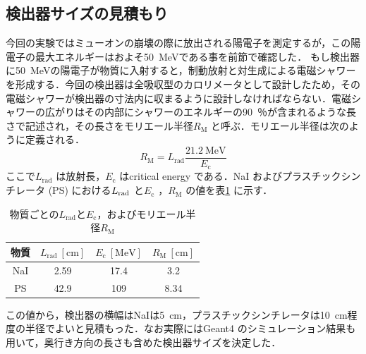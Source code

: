 \subsection{検出器サイズの見積もり}
今回の実験ではミューオンの崩壊の際に放出される陽電子を測定するが，この陽電子の最大エネルギーはおよそ50~MeVである事を前節で確認した．
もし検出器に50~MeVの陽電子が物質に入射すると，制動放射と対生成による電磁シャワーを形成する．今回の検出器は全吸収型のカロリメータとして設計したため，その電磁シャワーが検出器の寸法内に収まるように設計しなければならない．電磁シャワーの広がりはその内部にシャワーのエネルギーの90~％が含まれるような長さで記述され，その長さをモリエール半径$R_\mathrm{M}$ と呼ぶ．モリエール半径は次のように定義される．
\begin{equation}
R_\mathrm{M} = L_\mathrm{rad}\frac{21.2~\mathrm{MeV}}{E_\mathrm{c}}
\end{equation}
ここで$L_\mathrm{rad}$ は放射長，$E_\mathrm{c}$ はcritical energy である．NaI およびプラスチックシンチレータ (PS) における$L_{\rm rad}$ と$E_\mathrm{c}$ ，$R_\mathrm{M}$ の値を表\ref{tab:abe_rm} に示す．
\begin{table}[hbtp]
\centering
\caption{物質ごとの$L_\mathrm{rad}$と$E_\mathrm{c}$，およびモリエール半径$R_\mathrm{M}$}
\begin{tabular}{cccc}\toprule
物質 & $L_\mathrm{rad}~[\mathrm{cm}]$ & $E_\mathrm{c}~[\mathrm{MeV}]$ & $R_\mathrm{M}~[\mathrm{cm}]$ \\ \midrule
NaI & 2.59 & 17.4 & 3.2 \\
PS & 42.9 & 109 & 8.34 \\ \bottomrule
\end{tabular}
\label{tab:abe_rm}
\end{table}
この値から，検出器の横幅はNaIは5~cm，プラスチックシンチレータは10~cm程度の半径でよいと見積もった．なお実際にはGeant4 のシミュレーション結果も用いて，奥行き方向の長さも含めた検出器サイズを決定した．

%

